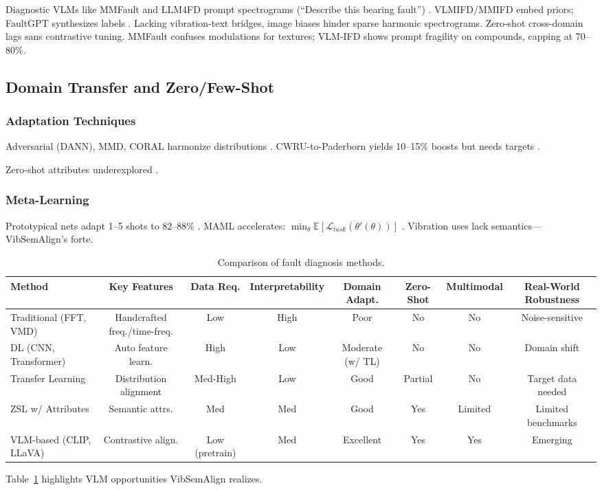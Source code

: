 Diagnostic VLMs like MMFault and LLM4FD prompt spectrograms (``Describe this bearing fault'') \cite{zhang2024mmfault,li2024llm4fd}. VLMIFD/MMIFD embed priors; FaultGPT synthesizes labels \cite{zhao2025vlmifd,xu2025mmifd,liu2024faultgpt}. Lacking vibration-text bridges, image biases hinder sparse harmonic spectrograms. Zero-shot cross-domain lags sans contrastive tuning. MMFault confuses modulations for textures; VLM-IFD shows prompt fragility on compounds, capping at 70--80\%.

\subsection{Domain Transfer and Zero/Few-Shot}
\subsubsection{Adaptation Techniques}

Adversarial (DANN), MMD, CORAL harmonize distributions \cite{qiao2022grl,li2021mmd,wen2020domain}. CWRU-to-Paderborn yields 10--15\% boosts but needs targets \cite{wang2020transfer}.

Zero-shot attributes underexplored \cite{chen2023gzsl}.

\subsubsection{Meta-Learning}

Prototypical nets adapt 1--5 shots to 82--88\% \cite{hoang2023vit}. MAML accelerates: $\min_\theta \mathbb{E} [\mathcal{L}_{task}(\theta'(\theta))]$ \cite{wen2022maml}. Vibration uses lack semantics---VibSemAlign's forte.

\begin{table}[t]
\centering
\caption{Comparison of fault diagnosis methods.}
\label{tab:comparison}
\begin{tabular}{@{}lccccccc@{}}
\toprule
Method & Key Features & Data Req. & Interpretability & Domain Adapt. & Zero-Shot & Multimodal & Real-World Robustness \\
\midrule
Traditional (FFT, VMD) & Handcrafted freq./time-freq. & Low & High & Poor & No & No & Noise-sensitive \\
DL (CNN, Transformer) & Auto feature learn. & High & Low & Moderate (w/ TL) & No & No & Domain shift \\
Transfer Learning & Distribution alignment & Med-High & Low & Good & Partial & No & Target data needed \\
ZSL w/ Attributes & Semantic attrs. & Med & Med & Good & Yes & Limited & Limited benchmarks \\
VLM-based (CLIP, LLaVA) & Contrastive align. & Low (pretrain) & Med & Excellent & Yes & Yes & Emerging \\
\bottomrule
\end{tabular}
\end{table}

Table~\ref{tab:comparison} highlights VLM opportunities VibSemAlign realizes.